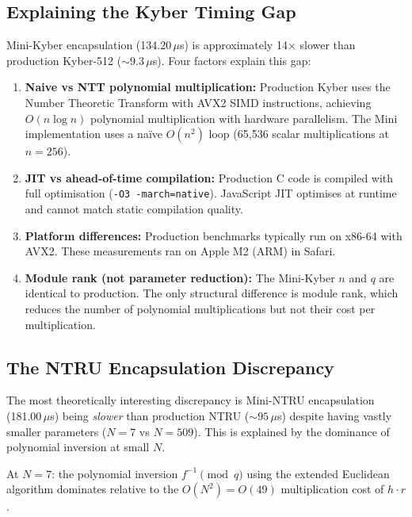 \documentclass[12pt,a4paper]{report}
\begin{document}
\subsection{Explaining the Kyber Timing Gap}

Mini-Kyber encapsulation (134.20\,$\mu$s) is approximately 14$\times$ slower than
production Kyber-512 ($\sim 9.3\,\mu$s). Four factors explain this gap:

\begin{enumerate}
  \item \textbf{Naive vs NTT polynomial multiplication:} Production Kyber uses the
  Number Theoretic Transform with AVX2 SIMD instructions, achieving $O(n \log n)$
  polynomial multiplication with hardware parallelism. The Mini implementation uses a
  na\"{i}ve $O(n^2)$ loop (65,536 scalar multiplications at $n = 256$).

  \item \textbf{JIT vs ahead-of-time compilation:} Production C code is compiled with
  full optimisation (\texttt{-O3 -march=native}). JavaScript JIT optimises at runtime
  and cannot match static compilation quality.

  \item \textbf{Platform differences:} Production benchmarks typically run on x86-64
  with AVX2. These measurements ran on Apple M2 (ARM) in Safari.

  \item \textbf{Module rank (not parameter reduction):} The Mini-Kyber $n$ and $q$
  are identical to production. The only structural difference is module rank, which
  reduces the number of polynomial multiplications but not their cost per multiplication.
\end{enumerate}

\subsection{The NTRU Encapsulation Discrepancy}
\label{sec:ntru-discrepancy}

The most theoretically interesting discrepancy is Mini-NTRU encapsulation (181.00\,$\mu$s)
being \emph{slower} than production NTRU ($\sim 95\,\mu$s) despite having vastly
smaller parameters ($N = 7$ vs $N = 509$). This is explained by the dominance of
polynomial inversion at small $N$.

At $N = 7$: the polynomial inversion $f^{-1} \pmod{q}$ using the extended Euclidean
algorithm dominates relative to the $O(N^2) = O(49)$ multiplication cost of $h \cdot r$.
\end{document}
